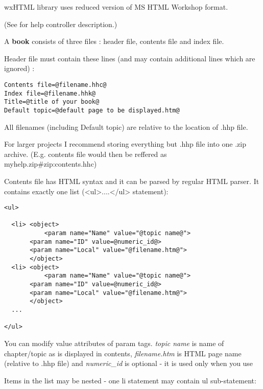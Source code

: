 \label{helpformat}

wxHTML library uses reduced version of MS HTML Workshop format.

(See  for help controller description.)

A {\bf book} consists of three files : header file, contents file and index file.


Header file must contain these lines (and may contain additional lines which are ignored) :

\begin{verbatim}
Contents file=@filename.hhc@
Index file=@filename.hhk@
Title=@title of your book@
Default topic=@default page to be displayed.htm@
\end{verbatim}

All filenames (including Default topic) are relative to the location of .hhp file.

For larger projects I recommend storing everything but .hhp file into one .zip archive. (E.g. contents file 
would then be reffered as myhelp.zip\#zip:contents.hhc)


Contents file has HTML syntax and it can be parsed by regular HTML parser. It contains exactly one list
(<ul>....</ul> statement):

\begin{verbatim}
<ul>

  <li> <object>
           <param name="Name" value="@topic name@">
	   <param name="ID" value=@numeric_id@>
	   <param name="Local" value="@filename.htm@">
       </object>
  <li> <object>
           <param name="Name" value="@topic name@">
	   <param name="ID" value=@numeric_id@>
	   <param name="Local" value="@filename.htm@">
       </object>
  ...    

</ul>
\end{verbatim}

You can modify value attributes of param tags. {\it topic name} is name of chapter/topic as is displayed in
contents, {\it filename.htm} is HTML page name (relative to .hhp file) and {\it numeric_id} is optional 
- it is used only when you use 

Items in the list may be nested - one \<li\> statement may contain \<ul\> sub-statement:

